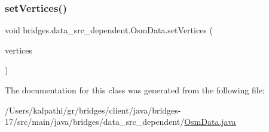 \subsubsection{\texorpdfstring{set\+Vertices()}{setVertices()}}
{\footnotesize\ttfamily void bridges.\+data\+\_\+src\+\_\+dependent.\+Osm\+Data.\+set\+Vertices (\begin{DoxyParamCaption}\item[{\mbox{\hyperlink{classbridges_1_1data__src__dependent_1_1_osm_vertex}{Osm\+Vertex}} \mbox{[}$\,$\mbox{]}}]{vertices }\end{DoxyParamCaption})}



The documentation for this class was generated from the following file\+:\begin{DoxyCompactItemize}
\item 
/\+Users/kalpathi/gr/bridges/client/java/bridges-\/17/src/main/java/bridges/data\+\_\+src\+\_\+dependent/\mbox{\hyperlink{_osm_data_8java}{Osm\+Data.\+java}}\end{DoxyCompactItemize}
